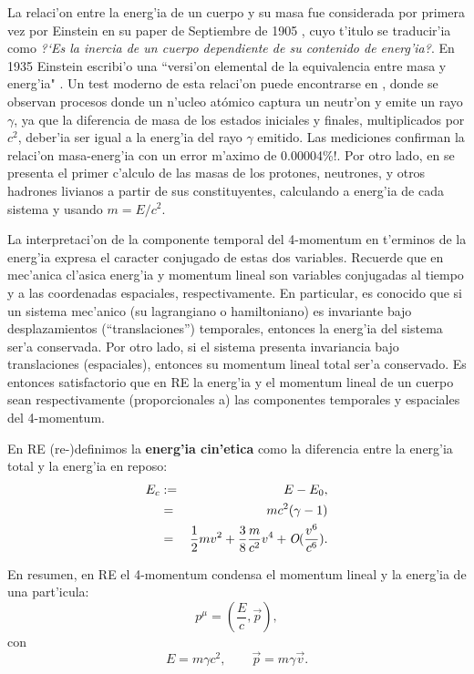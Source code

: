 La relaci'on entre la energ'ia de un cuerpo y su masa fue considerada por primera vez por Einstein en su paper de Septiembre de 1905 \cite{Einstein05}, cuyo t'itulo se traducir'ia como \textit{?`Es la inercia de un cuerpo dependiente de su contenido de energ'ia?}. En 1935 Einstein escribi'o una ``versi'on elemental de la equivalencia entre masa y energ'ia" \cite{Einstein35}. Un test moderno de esta relaci'on puede encontrarse en \cite{Rainville05}, donde se observan procesos donde un n'ucleo atómico captura un neutr'on y emite un rayo $\gamma$, ya que la diferencia de masa de los estados iniciales y finales, multiplicados por $c^2$, deber'ia ser igual a la energ'ia del rayo $\gamma$ emitido. Las mediciones confirman la relaci'on masa-energ'ia con un error m'aximo de 0.00004\%!. Por otro lado, en \cite{Duerr08} se presenta el primer c'alculo de las masas de los protones, neutrones, y otros hadrones livianos a partir de sus constituyentes, calculando a energ'ia de cada sistema y usando $m=E/c^2$.

La interpretaci'on de la componente temporal del 4-momentum en t'erminos de la energ'ia expresa el caracter conjugado de estas dos variables. Recuerde que en mec'anica cl'asica energ'ia y momentum lineal son variables conjugadas al tiempo y a las coordenadas espaciales, respectivamente. En particular, es conocido que si un sistema mec'anico (su lagrangiano o hamiltoniano) es invariante bajo desplazamientos (``translaciones'') temporales, entonces la energ'ia del sistema ser'a conservada. Por otro lado, si el sistema presenta invariancia bajo translaciones (espaciales), entonces su momentum lineal total ser'a conservado. Es entonces satisfactorio que en RE la energ'ia y el momentum lineal de un cuerpo sean respectivamente (proporcionales a) las componentes temporales y espaciales del 4-momentum.

En RE (re-)definimos la \textbf{energ'ia cin'etica} como la diferencia entre la
energ'ia total y la energ'ia en reposo:
\begin{eqnarray}
E_{c}&:=&E-E_0,\\
&=&mc^2(\gamma-1)\\
&=&\frac{1}{2}mv^2+\frac{3}{8}\frac{m}{c^2}v^4+\emph{O}(\frac{v^{6}}{c^{6}}).
\end{eqnarray}

En resumen, en RE el 4-momentum condensa el momentum lineal y la energ'ia de una
part'icula:
\begin{equation}
\boxed{p^\mu=(\frac{E}{c},\vec{p}) ,\label{pep}}
\end{equation}
con
\begin{equation}
\boxed{E=m\gamma c^2, \qquad \vec{p}=m\gamma \vec{v}.}
\end{equation}


